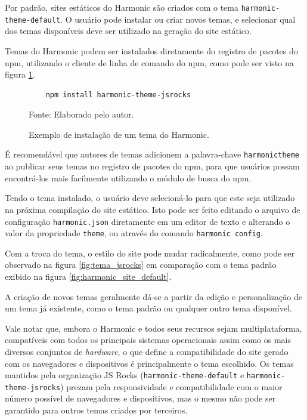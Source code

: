 \documentclass[ppginf, pep]{esinucpel}
\newcommand{\code}[1]{\texttt{#1}}
\begin{document}
Por padrão, sites estáticos do Harmonic são criados com o tema \code{harmonic-theme-default}. O usuário pode instalar ou criar novos temas, e selecionar qual dos temas disponíveis deve ser utilizado na geração do site estático.

Temas do Harmonic podem ser instalados diretamente do registro de pacotes do npm, utilizando o cliente de linha de comando do npm, como pode ser visto na figura \ref{fig:comando_install_theme}.

\begin{figure}[htbp]
    \centering
    \caption{Exemplo de instalação de um tema do Harmonic.}
    \vspace{5pt}
    \lstset{language=sh}
    \begin{lstlisting}
    npm install harmonic-theme-jsrocks
    \end{lstlisting}
    Fonte: Elaborado pelo autor.
    \label{fig:comando_install_theme}
\end{figure}

É recomendável que autores de temas adicionem a palavra-chave \code{harmonictheme} ao publicar seus temas no registro de pacotes do npm, para que usuários possam encontrá-los mais facilmente utilizando o módulo de busca do npm.

Tendo o tema instalado, o usuário deve selecioná-lo para que este seja utilizado na próxima compilação do site estático. Isto pode ser feito editando o arquivo de configuração \code{harmonic.json} diretamente em um editor de texto e alterando o valor da propriedade \code{theme}, ou através do comando \code{harmonic config}.

Com a troca do tema, o estilo do site pode mudar radicalmente, como pode ser observado na figura \ref{fig:tema_jsrocks} em comparação com o tema padrão exibido na figura \ref{fig:harmonic_site_default}.

A criação de novos temas geralmente dá-se a partir da edição e personalização de um tema já existente, como o tema padrão ou qualquer outro tema disponível. %

Vale notar que, embora o Harmonic e todos seus recursos sejam multiplataforma, compatíveis com todos os principais sistemas operacionais assim como os mais diversos conjuntos de \textit{hardware}, o que define a compatibilidade do site gerado com os navegadores e dispositivos é principalmente o tema escolhido. Os temas mantidos pela organização JS Rocks (\code{harmonic-theme-default} e \code{harmonic-theme-jsrocks}) prezam pela responsividade e compatibilidade com o maior número possível de navegadores e dispositivos, mas o mesmo não pode ser garantido para outros temas criados por terceiros.
\end{document}
